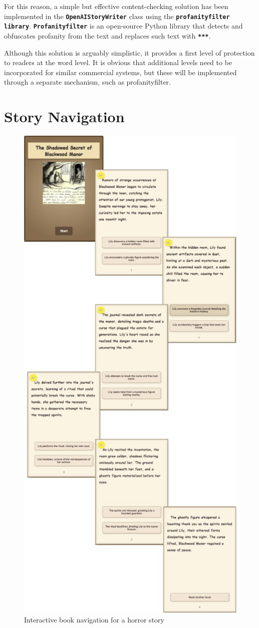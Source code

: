 \documentclass[conference]{IEEEtran}
\begin{document}
	For this reason, a simple but effective content-checking solution has been implemented in the \textbf{\texttt{OpenAIStoryWriter}} class using the \textbf{\texttt{profanityfilter library}}. \textbf{\texttt{Profanityfilter}} is an open-source Python library that detects and obfuscates profanity from the text and replaces such text with \textbf{\texttt{***}}.
	
	Although this solution is arguably simplistic, it provides a first level of protection to readers at the word level. It is obvious that additional levels need to be incorporated for similar commercial systems, but these will be implemented through a separate mechanism, such as profanityfilter.

	
\printbibliography
\onecolumn
\pagebreak

\appendices

\section{Story Navigation}
\label{appendix:navigation}
	
	\begin{figure}[H]
		\centering
		\includegraphics[width=0.5\linewidth]{img/img-ari3333-project-report-story-horror}
		\caption{Interactive book navigation for a horror story}
		\label{fig:img-ari3333-project-report-story-horror}
	\end{figure}
	
\end{document}
